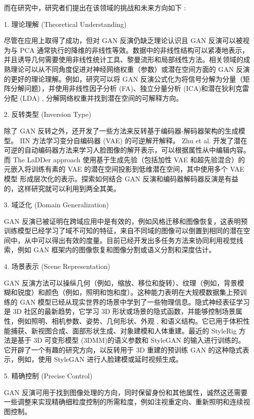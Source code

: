而在研究中，研究者们提出在该领域的挑战和未来方向如下 :

1. 理论理解 (Theoretical Understanding)

尽管在应用上取得了成功，但对 GAN 反演仍缺乏理论认识且 GAN 反演可以被视为与 PCA 通常执行的降维的非线性等效。数据中的非线性结构可以紧凑地表示，并且诱导几何需要使用非线性统计工具、黎曼流形和局部线性方法。相关领域的成熟理论可以从不同角度促进对神经网络权重（参数）或潜在空间方面的 GAN 反演的更好的理论理解。例如，研究可以将 GAN 反演公式化为将信号分解为分量（矩阵分解问题），并使用非线性因子分析 (FA)、独立分量分析 (ICA)和潜在狄利克雷分配 (LDA) , 分解网络权重并找到潜在空间的可解释方向。

2. 反转类型 (Inversion Type)

除了 GAN 反转之外，还开发了一些方法来反转基于编码器-解码器架构的生成模型。 IIN 方法学习变分自编码器 (VAE) 的可逆解开解释。 Zhu et al. 开发了潜在可逆的自动编码器方法来学习人脸图像的解开表示，可以根据属性从中编辑内容。而 The LaDDer approach 使用基于生成先验（包括加性 VAE 和超先验混合）的元嵌入将训练有素的 VAE 的潜在空间投影到低维潜在空间，其中使用多个 VAE 模型 形成层次化的表示。探索如何结合 GAN 反演和编码器解码器反演是有益的，这样研究就可以利用到两全其美。

3. 域泛化 (Domain Generalization) 

GAN 反演已被证明在跨域应用中是有效的，例如风格迁移和图像恢复，这表明预训练模型已经学习了域不可知的特征，来自不同域的图像可以倒置到相同的潜在空间中，从中可以得出有效的度量。目前已经开发出多任务方法来协同利用视觉线索，例如 GAN 框架内的图像恢复和图像分割或语义分割和深度估计。

4. 场景表示 (Scene Representation)

GAN 反演方法可以操纵几何（例如，缩放、移位和旋转）、纹理（例如，背景模     糊和锐度）和颜色（例如，照明和饱和度）。这种能力表明在大规模数据集上预训练的 GAN 模型已经从现实世界的场景中学到了一些物理信息。隐式神经表征学习是 3D 社区的最新趋势，它学习 3D 形状或场景的隐式函数，并能够控制场景属性，例如照明、相机参数、姿势、几何形状、外观 , 和语义结构。它已用于体积性能捕获、新视图合成、面部形状生成、对象建模和人体重建。最近的 StyleRig 方法是基于 3D 可变形模型 (3DMM)的语义参数和 StyleGAN 的输入进行训练的。它开辟了一个有趣的研究方向，以反转用于 3D 重建的预训练 GAN 的这种隐式表示，例如，使用 StyleGAN 进行人脸建模或延时视频生成。

5. 精确控制 (Precise Control)

GAN 反演可用于找到图像处理的方向，同时保留身份和其他属性，诚然这还需要一些调整来实现精确细粒度控制的所需粒度，例如注视重定向、重新照明和连续视图控制。

